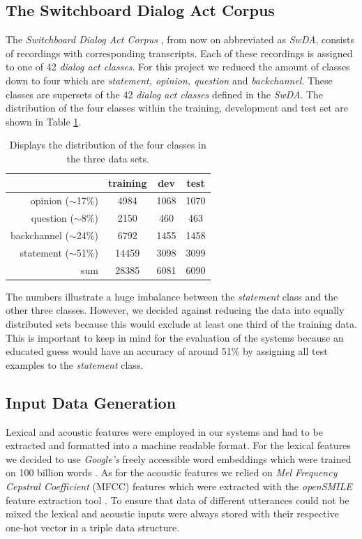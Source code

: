 \documentclass[11pt,a4paper]{article}
\begin{document}
	\subsection{The Switchboard Dialog Act Corpus}
	The \textit{Switchboard Dialog Act Corpus} \cite{switchboard}, from now on abbreviated as \textit{SwDA}, consists of recordings with corresponding transcripts. Each of these recordings is assigned to one of 42 \textit{dialog act classes}. For this project we reduced the amount of classes down to four which are \textit{statement, opinion, question} and \textit{backchannel}. These classes are supersets of the 42 \textit{dialog act classes} defined in the \textit{SwDA}. The distribution of the four classes within the training, development and test set are shown in Table \ref{tab:dataDistribution}.
	\begin{table}[]
		\begin{tabular}{ r | c c c }
			& training & dev & test \\
			\hline
			opinion ($\sim$17\%) & 4984 & 1068 & 1070 \\
			question ($\sim$8\%) & 2150 & 460 & 463 \\
			backchannel ($\sim$24\%) & 6792 & 1455 & 1458  \\
			statement ($\sim$51\%) & 14459 & 3098 &  3099  \\
			\hline
			sum & 28385 & 6081 & 6090 \\
		\end{tabular}
		\caption{Displays the distribution of the four classes in the three data sets.}
		\label{tab:dataDistribution}
	\end{table}	
	The numbers illustrate a huge imbalance between the \textit{statement} class and the other three classes. However, we decided against reducing the data into equally distributed sets because this would exclude at least one third of the training data. This is important to keep in mind for the evaluation of the systems because an educated guess would have an accuracy of around 51\% by assigning all test examples to the \textit{statement} class.

	\subsection{Input Data Generation}
	Lexical and acoustic features were employed in our systems and had to be extracted and formatted into a machine readable format. For the lexical features we decided to use \textit{Google's} freely accessible word embeddings which were trained on 100 billion words \cite{word2vec}. As for the acoustic features we relied on \textit{Mel Frequency Cepstral Coefficient} (MFCC) features which were extracted with the \textit{openSMILE} feature extraction tool \cite{opensmile}. To ensure that data of different utterances could not be mixed the lexical and acoustic inputs were always stored with their respective one-hot vector in a triple data structure.
	
\end{document}
